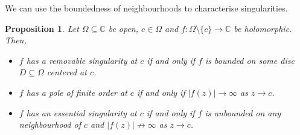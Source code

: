 \documentclass[a4paper, openany]{memoir}
\theoremstyle{definition}
\theoremstyle{plain}
\newtheorem{proposition}[definition]{Proposition}
\begin{document}
We can use the boundedness of neighbourhoods to characterise singularities.
\begin{proposition}
Let $\Omega \subseteq \mathbb{C}$ be open, $c \in \Omega$ and $f: \Omega \setminus \{c\} \to \mathbb{C}$ be holomorphic. Then,
\begin{itemize}
    \item $f$ has a removable singularity at $c$ if and only if $f$ is bounded on some disc $D \subseteq \Omega$ centered at $c$.
    \item $f$ has a pole of finite order at $c$ if and only if $|f(z)| \to \infty$ as $z \to c$.
    \item $f$ has an essential singularity at $c$ if and only if $f$ is unbounded on any neighbourhood of $c$ and $|f(z)| \not\to \infty$ as $z \to c$.
\end{itemize}
\end{proposition}
\end{document}
